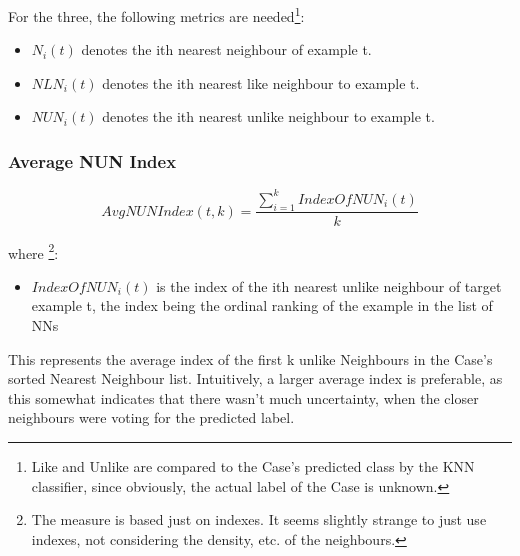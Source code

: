 \documentclass[a4paper,11pt]{report}
\begin{document}
For the three, the following metrics are needed\footnote{Like and Unlike are compared to the Case's predicted class by the KNN classifier, since obviously, the actual label of the Case is unknown.}:
\begin{itemize} 
	\item $N_{i}(t)$ denotes the ith nearest neighbour of example t.
	\item $NLN_{i}(t)$ denotes the ith nearest like neighbour to example t.
	\item $NUN_{i}(t)$ denotes the ith nearest unlike neighbour to example t.
\end{itemize}

\subsubsection{Average NUN Index}

\[
AvgNUNIndex(t,k)=\frac{\sum_{i=1}^{k}IndexOfNUN_{i}(t)}{k}
\]

where \footnote{The measure is based just on indexes. It seems slightly strange to just use indexes, not considering the density, etc. of the neighbours.}:
\begin{itemize}
	\item $IndexOfNUN_{i}(t)$ is the index of the ith nearest unlike neighbour of target example t, the index being the ordinal ranking of the example in the list of NNs
\end{itemize}

This represents the average index of the first k unlike Neighbours in the Case's sorted Nearest Neighbour list. Intuitively, a larger average index is preferable, as this somewhat indicates that there wasn't much uncertainty, when the closer neighbours were voting for the predicted label.
\vspace{10pt}
\end{document}
